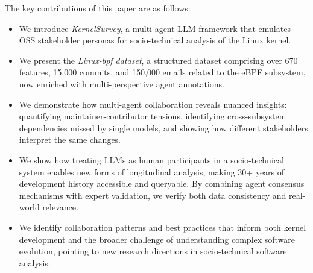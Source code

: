 \documentclass[sigconf,review,anonymous]{acmart}
\newcommand{\sys}{\textit{KernelSurvey}\xspace}
\begin{document}
% 
The key contributions of this paper are as follows:

\begin{itemize}
    \item We introduce \sys, a multi-agent LLM framework that emulates OSS stakeholder personas for socio-technical analysis of the Linux kernel.
    \item We present the \textit{Linux-bpf dataset}, a structured dataset comprising over 670 features, 15,000 commits, and 150,000 emails related to the eBPF subsystem, now enriched with multi-perspective agent annotations.
    \item We demonstrate how multi-agent collaboration reveals nuanced insights: quantifying maintainer-contributor tensions, identifying cross-subsystem dependencies missed by single models, and showing how different stakeholders interpret the same changes.
    \item We show how treating LLMs as human participants in a socio-technical system enables new forms of longitudinal analysis, making 30+ years of development history accessible and queryable. By combining agent consensus mechanisms with expert validation, we verify both data consistency and real-world relevance.
    \item We identify collaboration patterns and best practices that inform both kernel development and the broader challenge of understanding complex software evolution, pointing to new research directions in socio-technical software analysis.
\end{itemize}
\end{document}
